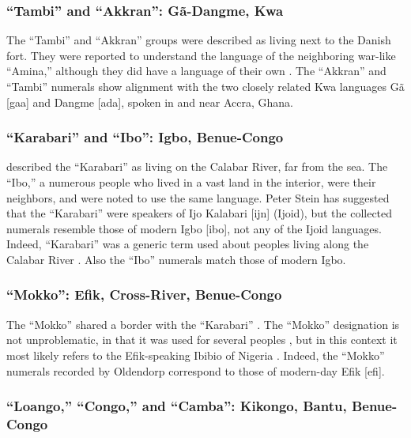 \documentclass[output=paper,colorlinks,citecolor=brown]{langscibook}
\begin{document}
\subsubsection{``Tambi'' and ``Akkran'': G\~a-Dangme, Kwa}

The ``Tambi'' and ``Akkran'' groups were described as living next to the Danish fort. They were reported to understand the language of the neighboring war-like ``Amina,'' although they did have a language of their own \citep[396, 399, 411]{Oldendorp_2000}. The “Akkran” and ``Tambi'' numerals show alignment with the two closely related Kwa languages G\~a [gaa] and Dangme [ada], spoken in and near Accra, Ghana.

\subsubsection{``Karabari'' and ``Ibo'': Igbo, Benue-Congo}

\citet[426]{Oldendorp_2000} described the ``Karabari'' as living on the Calabar River, far from the sea. The ``Ibo,'' a numerous people who lived in a vast land in the interior, were their neighbors, and were noted to use the same language. Peter Stein \citep[426, fn. 108]{Oldendorp_2000} has suggested that the ``Karabari'' were speakers of Ijo Kalabari [ijn] (Ijoid), but the collected numerals resemble those of modern Igbo [ibo], not any of the Ijoid languages. Indeed, ``Karabari'' was a generic term used about peoples living along the Calabar River \citep[cf.][138]{Fodor_1975}. Also the ``Ibo'' numerals match those of modern Igbo.

\subsubsection{``Mokko'': Efik, Cross-River, Benue-Congo}

The ``Mokko'' shared a border with the ``Karabari'' \citep[434]{Oldendorp_2000}. The ``Mokko'' designation is not unproblematic, in that it was used for several peoples \citep[434, fn. 115]{Oldendorp_2000}, but in this context it most likely refers to the Efik-speaking Ibibio of Nigeria \citep[263]{Hair_1967}. Indeed, the ``Mokko'' numerals recorded by Oldendorp correspond to those of modern-day Efik [efi].

\subsubsection{``Loango,'' ``Congo,'' and ``Camba'': Kikongo, Bantu, Benue-Congo}
\end{document}
